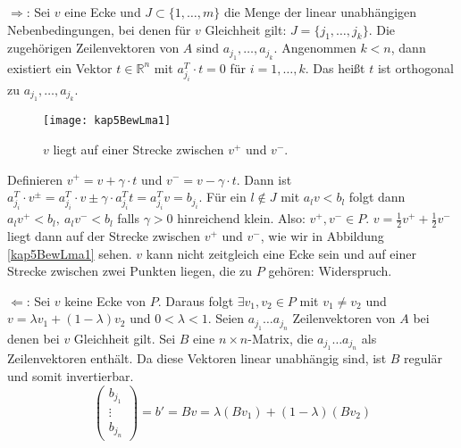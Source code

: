 \begin{Bew}
  \hspace{\parindent}\glq$\Rightarrow$\grq: Sei $v$ eine Ecke und $J \subset \{1, \ldots, m\}$ die Menge der linear unabhängigen Nebenbedingungen, bei denen für $v$ Gleichheit gilt: $J = \{j_1, \ldots, j_k\}$. Die zugehörigen Zeilenvektoren von $A$ sind $a_{j_1}, \ldots, a_{j_k}$. Angenommen $k < n$, dann existiert ein Vektor $t \in \mathbb{R}^n$ mit $a^T_{j_i} \cdot t = 0$ für $i=1, \ldots, k$. Das heißt $t$ ist orthogonal zu $a_{j_1}, \ldots, a_{j_k}$.
  \begin{figure}[htb]
    \centering
    \texttt{[image: kap5BewLma1]}
    \caption{$v$ liegt auf einer Strecke zwischen $v^+$ und $v^-$.}
    \label{kap5BewLma1}
  \end{figure}
  Definieren $v^+ = v + \gamma \cdot t$ und $v^- = v - \gamma \cdot t$. Dann ist $a^T_{j_i} \cdot v^{\pm} = a^T_{j_i} \cdot v \pm \gamma \cdot a^T_{j_i} t = a^T_{j_i} v = b_{j_i}$. Für ein $l \notin J$ mit $a_lv < b_l$ folgt dann $a_l v^+ < b_l,~ a_lv^- < b_l$ falls $\gamma > 0$ hinreichend klein. Also: $v^+, v^- \in P$. $v=\frac{1}{2}v^+ + \frac{1}{2} v^-$ liegt dann auf der Strecke zwischen $v^+$ und $v^-$, wie wir in Abbildung \vref{kap5BewLma1} sehen. $v$ kann nicht zeitgleich eine Ecke sein und auf einer Strecke zwischen zwei Punkten liegen, die zu $P$ gehören: Widerspruch.
  
  \glq$\Leftarrow$\grq: Sei $v$ keine Ecke von $P$. Daraus folgt $\exists v_1, v_2 \in P$ mit $v_1 \neq v_2$ und $v= \lambda v_1 + (1- \lambda) v_2$ und $0 < \lambda < 1$. Seien $a_{j_1} \ldots a_{j_n}$ Zeilenvektoren von $A$ bei denen bei $v$ Gleichheit gilt. Sei $B$ eine $n \times n$-Matrix, die $a_{j_1} \ldots a_{j_n}$ als Zeilenvektoren enthält. Da diese Vektoren linear unabhängig sind, ist $B$ regulär und somit invertierbar.
  \[ \begin{pmatrix}b_{j_1} \\ \vdots \\ b_{j_n} \end{pmatrix} = b' = B v = \lambda (B v_1) + (1-\lambda)(B v_2) \]
  

\end{Bew}

